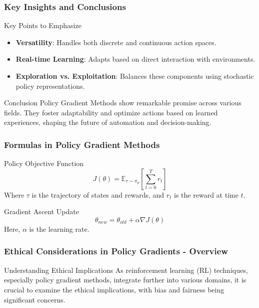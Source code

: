 \documentclass{beamer}
\begin{document}
\begin{frame}[fragile]
    \frametitle{Key Insights and Conclusions}
    \begin{block}{Key Points to Emphasize}
        \begin{itemize}
            \item \textbf{Versatility}: Handles both discrete and continuous action spaces.
            \item \textbf{Real-time Learning}: Adapts based on direct interaction with environments.
            \item \textbf{Exploration vs. Exploitation}: Balances these components using stochastic policy representations.
        \end{itemize}
    \end{block}

    \begin{block}{Conclusion}
        Policy Gradient Methods show remarkable promise across various fields. They foster adaptability and optimize actions based on learned experiences, shaping the future of automation and decision-making.
    \end{block}
\end{frame}

\begin{frame}[fragile]
    \frametitle{Formulas in Policy Gradient Methods}
    \begin{block}{Policy Objective Function}
        \begin{equation}
            J(\theta) = \mathbb{E}_{\tau \sim \pi_\theta} \left[ \sum_{t=0}^{T} r_t \right]
        \end{equation}
        Where \( \tau \) is the trajectory of states and rewards, and \( r_t \) is the reward at time \( t \).
    \end{block}

    \begin{block}{Gradient Ascent Update}
        \begin{equation}
            \theta_{new} = \theta_{old} + \alpha \nabla J(\theta)
        \end{equation}
        Here, \( \alpha \) is the learning rate.
    \end{block}
\end{frame}

\begin{frame}[fragile]
    \frametitle{Ethical Considerations in Policy Gradients - Overview}
    \begin{block}{Understanding Ethical Implications}
        As reinforcement learning (RL) techniques, especially policy gradient methods, integrate further into various domains,  
        it is crucial to examine the ethical implications, with bias and fairness being significant concerns.
    \end{block}
\end{frame}
\end{document}

